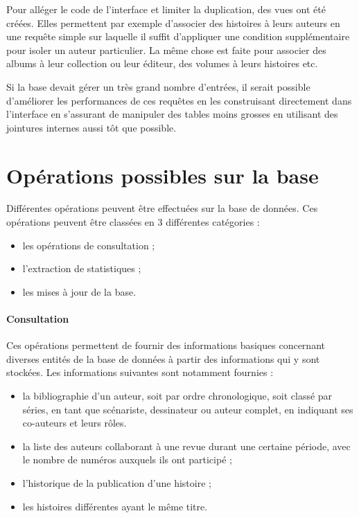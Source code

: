 \documentclass[12pt]{article}
\begin{document}
Pour alléger le code de l'interface et limiter la duplication, des vues ont été créées. Elles permettent
par exemple d'associer des histoires à leurs auteurs en une requête simple sur
laquelle il suffit d'appliquer une condition supplémentaire pour isoler un
auteur particulier. La même chose est faite pour associer des albums à leur
collection ou leur éditeur, des volumes à leurs histoires etc.

Si la base devait gérer un très grand nombre d'entrées, il serait possible
d'améliorer les performances de ces requêtes en les construisant directement
dans l'interface en s'assurant de manipuler des tables moins grosses en
utilisant des jointures internes aussi tôt que possible.


\section{Opérations possibles sur la base}

Différentes opérations peuvent être effectuées sur la base de données.
Ces opérations peuvent être classées en 3 différentes catégories :
\begin{itemize}
	\item les opérations de consultation ;
	\item l'extraction de statistiques ;
	\item les mises à jour de la base.
\end{itemize}

\paragraph{Consultation}

Ces opérations permettent de fournir des informations basiques concernant
diverses entités de la base de données à partir des informations qui y sont
stockées.
Les informations suivantes sont notamment fournies :
\begin{itemize}
	\item la bibliographie d’un auteur, soit par ordre chronologique, soit classé par séries, en tant que
		scénariste, dessinateur ou auteur complet, en indiquant ses co-auteurs et leurs rôles.
	\item la liste des auteurs collaborant à une revue durant une certaine période, avec le nombre de
		numéros auxquels ils ont participé ;
	\item l'historique de la publication d’une histoire ;
	\item les histoires différentes ayant le même titre.
\end{itemize}
\end{document}
